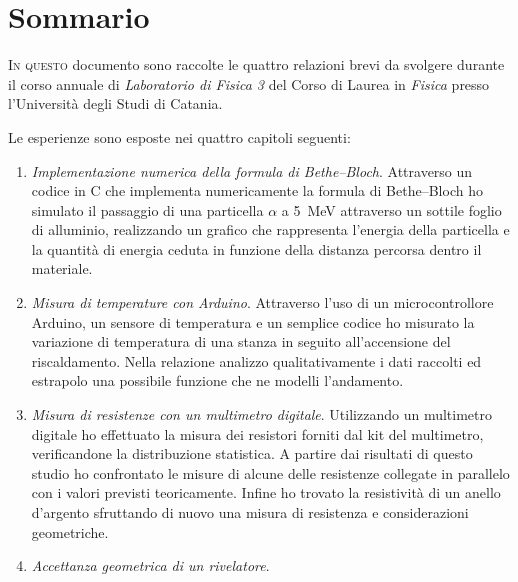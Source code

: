 \chapter{Sommario}
    \lettrine[loversize=0.08, lines=2]{I}{n questo} documento sono raccolte le quattro relazioni brevi da svolgere durante il corso annuale di \emph{Laboratorio di Fisica 3} del Corso di Laurea in \emph{Fisica} presso l'Università degli Studi di Catania.

    Le esperienze sono esposte nei quattro capitoli seguenti:
    \begin{enumerate}
        \item \emph{Implementazione numerica della formula di Bethe--Bloch}. Attraverso un codice in C che implementa numericamente la formula di Bethe--Bloch ho simulato il passaggio di una particella $\alpha$ a \SI{5}{\mega\eV} attraverso un sottile foglio di alluminio, realizzando un grafico che rappresenta l'energia della particella e la quantità di energia ceduta in funzione della distanza percorsa dentro il materiale.
        \item \emph{Misura di temperature con Arduino}. Attraverso l'uso di un microcontrollore Arduino, un sensore di temperatura e un semplice codice ho misurato la variazione di temperatura di una stanza in seguito all'accensione del riscaldamento. Nella relazione analizzo qualitativamente i dati raccolti ed estrapolo una possibile funzione che ne modelli l'andamento.
        \item \emph{Misura di resistenze con un multimetro digitale}. Utilizzando un multimetro digitale ho effettuato la misura dei resistori forniti dal kit del multimetro, verificandone la distribuzione statistica. A partire dai risultati di questo studio ho confrontato le misure di alcune delle resistenze collegate in parallelo con i valori previsti teoricamente. Infine ho trovato la resistività di un anello d'argento sfruttando di nuovo una misura di resistenza e considerazioni geometriche.
        \item \emph{Accettanza geometrica di un rivelatore}.
    \end{enumerate} 